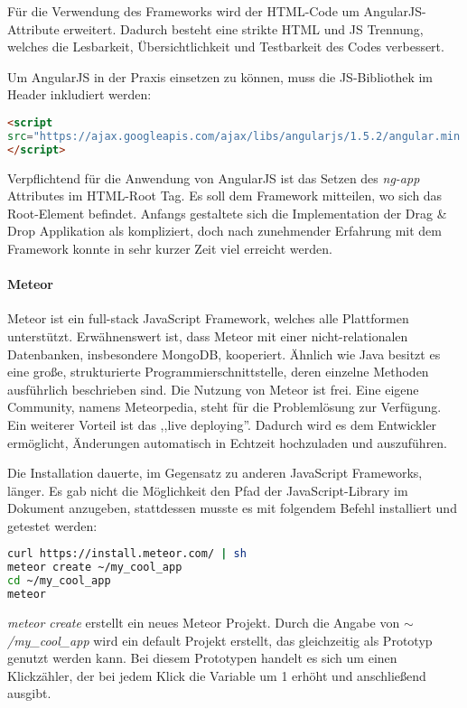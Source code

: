 Für die Verwendung des Frameworks wird der HTML-Code um AngularJS-Attribute erweitert. Dadurch besteht eine strikte HTML und JS Trennung, welches die Lesbarkeit, Übersichtlichkeit und Testbarkeit des Codes verbessert. \cite{ANGULARJS}

Um AngularJS in der Praxis einsetzen zu können, muss die JS-Bibliothek im Header inkludiert werden: 
\begin{lstlisting}[caption={AngularJS einbinden\cite{ANGULARJSDOWN}}, language=HTML]
<script 
src="https://ajax.googleapis.com/ajax/libs/angularjs/1.5.2/angular.min.js">
</script>
\end{lstlisting}

Verpflichtend für die Anwendung von AngularJS ist das Setzen des \textit{ng-app} Attributes im HTML-Root Tag. Es soll dem Framework mitteilen, wo sich das Root-Element befindet. Anfangs gestaltete sich die Implementation der Drag \& Drop Applikation als kompliziert, doch nach zunehmender Erfahrung mit dem Framework konnte in sehr kurzer Zeit viel erreicht werden.

\paragraph{Meteor}
Meteor ist ein full-stack JavaScript Framework, welches alle Plattformen unterstützt. Erwähnenswert ist, dass Meteor mit einer nicht-relationalen Datenbanken, insbesondere MongoDB, kooperiert. Ähnlich wie Java besitzt es eine große, strukturierte Programmierschnittstelle, deren einzelne Methoden ausführlich beschrieben sind. Die Nutzung von Meteor ist frei. Eine eigene Community, namens Meteorpedia, steht für die Problemlösung zur Verfügung. Ein weiterer Vorteil ist das ,,live deploying''. Dadurch wird es dem Entwickler ermöglicht, Änderungen automatisch in Echtzeit hochzuladen und auszuführen. \cite{METEOR}

\newpage

Die Installation dauerte, im Gegensatz zu anderen JavaScript Frameworks, länger. Es gab nicht die Möglichkeit den Pfad der JavaScript-Library im Dokument anzugeben, stattdessen musste es mit folgendem Befehl installiert und getestet werden:
\begin{lstlisting}[caption={Installation von Meteor \cite{METEORINSTALL}}, language=bash]
curl https://install.meteor.com/ | sh
meteor create ~/my_cool_app
cd ~/my_cool_app
meteor
\end{lstlisting}

\textit{meteor create} erstellt ein neues Meteor Projekt. Durch die Angabe von \textit{$\sim$/my\_cool\_app} wird ein default Projekt erstellt, das gleichzeitig als Prototyp genutzt werden kann. Bei diesem Prototypen handelt es sich um einen Klickzähler, der bei jedem Klick die Variable um 1 erhöht und anschließend ausgibt.

